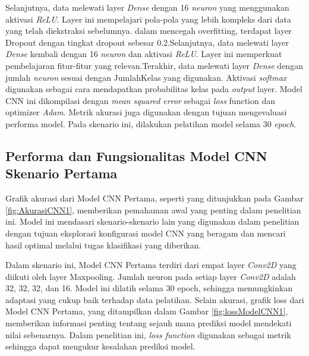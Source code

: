Selanjutnya, data melewati layer \textit{Dense} dengan 16 \textit{neuron} yang menggunakan aktivasi \textit{ReLU}. Layer ini mempelajari pola-pola yang lebih kompleks dari data yang telah diekstraksi sebelumnya. dalam mencegah overfitting, terdapat layer Dropout dengan tingkat dropout sebesar 0.2.Selanjutnya, data melewati layer \textit{Dense} kembali dengan 16 \textit{neuron} dan aktivasi \textit{ReLU}. Layer ini memperkuat pembelajaran fitur-fitur yang relevan.Terakhir, data melewati layer \textit{Dense} dengan jumlah \textit{neuron} sesuai dengan JumlahKelas yang digunakan. Aktivasi \textit{softmax} digunakan sebagai cara mendapatkan probabilitas kelas pada \textit{output} layer. Model CNN ini dikompilasi dengan \textit{mean squared error} sebagai \textit{loss} function dan optimizer \textit{Adam}. Metrik akurasi juga digunakan dengan tujuan mengevaluasi performa model. Pada skenario ini, dilakukan pelatihan model selama 30 \textit{epoch}.

\subsection*{Performa dan Fungsionalitas Model CNN Skenario Pertama}
Grafik akurasi dari Model CNN Pertama, seperti yang ditunjukkan pada Gambar \ref{fig:AkurasiCNN1}, memberikan pemahaman awal yang penting dalam penelitian ini. Model ini mendasari skenario-skenario lain yang digunakan dalam penelitian dengan tujuan eksplorasi konfigurasi model CNN yang beragam dan mencari hasil optimal melalui tugas klasifikasi yang diberikan.

Dalam skenario ini, Model CNN Pertama terdiri dari empat layer \textit{Conv2D} yang diikuti oleh layer Maxpooling. Jumlah neuron pada setiap layer \textit{Conv2D} adalah 32, 32, 32, dan 16. Model ini dilatih selama 30 epoch, sehingga memungkinkan adaptasi yang cukup baik terhadap data pelatihan. Selain akurasi, grafik loss dari Model CNN Pertama, yang ditampilkan dalam Gambar \ref{fig:lossModelCNN1}, memberikan informasi penting tentang sejauh mana prediksi model mendekati nilai sebenarnya. Dalam penelitian ini, \textit{loss function} digunakan sebagai metrik sehingga dapat mengukur kesalahan prediksi model.

